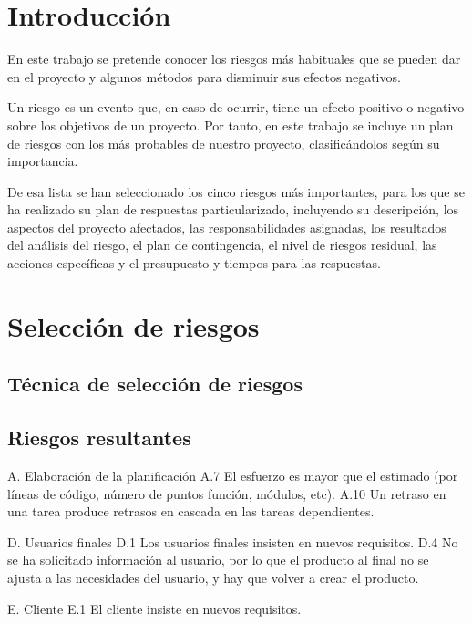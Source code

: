 \documentclass[11pt,a4paper,spanish,twoside]{report}
\begin{document}
\tableofcontents
\listoftables
\listoffigures


\chapter*{Introducción}

En este trabajo se pretende conocer los riesgos más habituales que se pueden 
dar en el proyecto y algunos métodos para disminuir sus efectos negativos.

Un riesgo es un evento que, en caso de ocurrir, tiene un efecto positivo o 
negativo sobre los objetivos de un proyecto. Por tanto, en este trabajo se 
incluye un plan de riesgos con los más probables de nuestro proyecto, 
clasificándolos según su importancia.

De esa lista se han seleccionado los cinco riesgos más importantes, para los
que se ha realizado su plan de respuestas particularizado, incluyendo su 
descripción, los aspectos del proyecto afectados, las responsabilidades 
asignadas, los resultados del análisis del riesgo, el plan de contingencia,
el nivel de riesgos residual, las acciones específicas y el presupuesto y 
tiempos para las respuestas.

\chapter{Selección de riesgos}


\section{Técnica de selección de riesgos}

\section{Riesgos resultantes}
A. Elaboración de la planificación
A.7 El esfuerzo es mayor que el estimado (por líneas de código, número de
puntos función, módulos, etc).
A.10 Un retraso en una tarea produce retrasos en cascada en las tareas
dependientes.

D. Usuarios finales
D.1 Los usuarios finales insisten en nuevos requisitos.
D.4 No se ha solicitado información al usuario, por lo que el producto al
final no se ajusta a las necesidades del usuario, y hay que volver a crear el
producto.

E. Cliente
E.1 El cliente insiste en nuevos requisitos.
\end{document}
